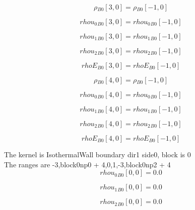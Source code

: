 \documentclass{article}
\begin{document}
\begin{dmath}{\rho{_{B0}}}[{3,0}] = {\rho{_{B0}}}[{-1,0}]\end{dmath}

\begin{dmath}{rhou_{0}{_{B0}}}[{3,0}] = {rhou_{0}{_{B0}}}[{-1,0}]\end{dmath}

\begin{dmath}{rhou_{1}{_{B0}}}[{3,0}] = {rhou_{1}{_{B0}}}[{-1,0}]\end{dmath}

\begin{dmath}{rhou_{2}{_{B0}}}[{3,0}] = {rhou_{2}{_{B0}}}[{-1,0}]\end{dmath}

\begin{dmath}{rhoE{_{B0}}}[{3,0}] = {rhoE{_{B0}}}[{-1,0}]\end{dmath}

\begin{dmath}{\rho{_{B0}}}[{4,0}] = {\rho{_{B0}}}[{-1,0}]\end{dmath}

\begin{dmath}{rhou_{0}{_{B0}}}[{4,0}] = {rhou_{0}{_{B0}}}[{-1,0}]\end{dmath}

\begin{dmath}{rhou_{1}{_{B0}}}[{4,0}] = {rhou_{1}{_{B0}}}[{-1,0}]\end{dmath}

\begin{dmath}{rhou_{2}{_{B0}}}[{4,0}] = {rhou_{2}{_{B0}}}[{-1,0}]\end{dmath}

\begin{dmath}{rhoE{_{B0}}}[{4,0}] = {rhoE{_{B0}}}[{-1,0}]\end{dmath}

\noindent The kernel is IsothermalWall boundary dir1 side0, block is 0\\\noindent The ranges are -3,block0np0 + 4,0,1,-3,block0np2 + 4\\\begin{dmath}{rhou_{0}{_{B0}}}[{0,0}] = 0.0\end{dmath}

\begin{dmath}{rhou_{1}{_{B0}}}[{0,0}] = 0.0\end{dmath}

\begin{dmath}{rhou_{2}{_{B0}}}[{0,0}] = 0.0\end{dmath}
\end{document}
